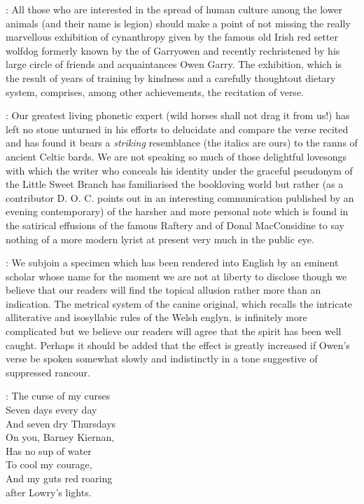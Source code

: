 :
All those who are interested in the spread of human culture among
the lower animals (and their name is legion) should make a point of not
missing the really marvellous exhibition of cynanthropy given by the
famous old Irish red setter wolfdog formerly known by the  of
Garryowen and recently rechristened by his large circle of friends and
acquaintances Owen Garry. The exhibition, which is the result of years of
training by kindness and a carefully thoughtout dietary system, comprises,
among other achievements, the recitation of verse.

:
Our greatest living
phonetic expert (wild horses shall not drag it from us!) has left no stone
unturned in his efforts to delucidate and compare the verse recited and has
found it bears a \emph{striking} resemblance (the italics are ours) to the ranns
of ancient Celtic bards. We are not speaking so much of those delightful
lovesongs with which the writer who conceals his identity under the
graceful pseudonym of the Little Sweet Branch has familiarised the
bookloving world but rather (as a contributor D. O. C. points out in an
interesting communication published by an evening contemporary) of the
harsher and more personal note which is found in the satirical effusions
of the famous Raftery and of Donal MacConsidine to say nothing of a more
modern lyrist at present very much in the public eye.

:
We subjoin a
specimen which has been rendered into English by an eminent scholar
whose name for the moment we are not at liberty to disclose though
we believe that our readers will find the topical allusion rather
more than an indication. The metrical system of the canine original,
which recalls the intricate alliterative and isosyllabic rules of
the Welsh englyn, is infinitely more complicated but we believe our
readers will agree that the spirit has been well caught. Perhaps
it should be added that the effect is greatly increased if Owen's
verse be spoken somewhat slowly and indistinctly in a tone suggestive
of suppressed rancour.

\garryowen:
    The curse of my curses\\
    Seven days every day\\
    And seven dry Thursdays\\
    On you, Barney Kiernan,\\
    Has no sup of water\\
    To cool my courage,\\
    And my guts red roaring\\
    after Lowry's lights.

